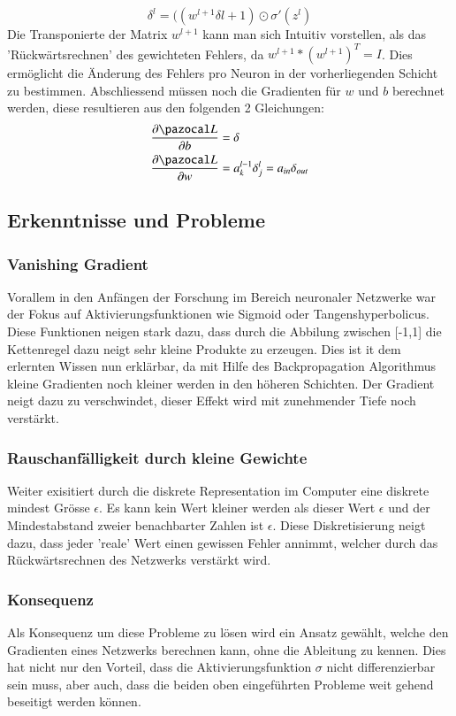 \begin{equation}
\delta^{l} = ((w^{l+1} \delta{l+1}) \odot \sigma'(z^l)
\end{equation}
Die Transponierte der Matrix $w^{l+1}$ kann man sich Intuitiv vorstellen, als das 'Rückwärtsrechnen' des gewichteten Fehlers, da $w^{l+1} * (w^{l+1})^T = I$. Dies ermöglicht die Änderung des Fehlers pro Neuron in der vorherliegenden Schicht zu bestimmen. Abschliessend müssen noch die Gradienten für $w$ und $b$ berechnet werden, diese resultieren aus den folgenden 2 Gleichungen:
\begin{equation}
\begin{split}
\frac{\partial \Lb}{\partial b} & = \delta \\
\frac{\partial \Lb}{\partial w} & = a^{l-1}_{k} \delta^{l}_j = a_{in} \delta_{out}
\end{split}
\end{equation}



\subsection{Erkenntnisse und Probleme}
\subsubsection{Vanishing Gradient}
Vorallem in den Anfängen der Forschung im Bereich neuronaler Netzwerke war der Fokus auf Aktivierungsfunktionen wie Sigmoid oder Tangenshyperbolicus. Diese Funktionen neigen stark dazu, dass durch die Abbilung zwischen [-1,1] die Kettenregel dazu neigt sehr kleine Produkte zu erzeugen. Dies ist it dem erlernten Wissen nun erklärbar, da mit Hilfe des Backpropagation Algorithmus kleine Gradienten noch kleiner werden in den höheren Schichten. Der Gradient neigt dazu zu verschwindet, dieser Effekt wird mit zunehmender Tiefe noch verstärkt.
\subsubsection{Rauschanfälligkeit durch kleine Gewichte}
Weiter exisitiert durch die diskrete Representation im Computer eine diskrete mindest Grösse $\epsilon$. Es kann kein Wert kleiner werden als dieser Wert $\epsilon$ und der Mindestabstand zweier benachbarter Zahlen ist $\epsilon$. Diese Diskretisierung neigt dazu, dass jeder 'reale' Wert einen gewissen Fehler annimmt, welcher durch das Rückwärtsrechnen des Netzwerks verstärkt wird.
\subsubsection{Konsequenz}
Als Konsequenz um diese Probleme zu lösen wird ein Ansatz gewählt, welche den Gradienten eines Netzwerks berechnen kann, ohne die Ableitung zu kennen. Dies hat nicht nur den Vorteil, dass die Aktivierungsfunktion $\sigma$ nicht differenzierbar sein muss, aber auch, dass die beiden oben eingeführten Probleme weit gehend beseitigt werden können. 


